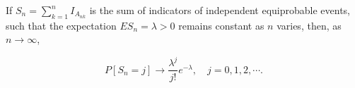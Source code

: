 If $S_n = \sum_{k=1}^{n} I_{A_{nk}}$ is the sum of indicators of independent equiprobable events, such that the expectation $ES_n = \lambda > 0$ remains constant as $n$ varies, then, as $n \to \infty$,

$$P[S_n = j] \to \frac{\lambda^j}{j!} e^{-\lambda}, \quad j = 0, 1, 2, \cdots.$$
